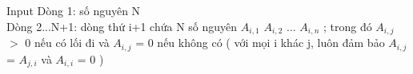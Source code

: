 Input
Dòng 1: số nguyên N   
\\   Dòng 2...N+1: dòng thứ i+1 chứa N số nguyên $A_{i,1}$   $A_{i,2}$   ... $A_{i,n}$   ; trong đó $A_{i,j}$   $>$ 0 nếu có lối đi và $A_{i,j}$   = 0 nếu không có ( với mọi i khác j, luôn đảm bảo $A_{i,j}$   = $A_{j,i}$   và $A_{i,i}$   = 0 )